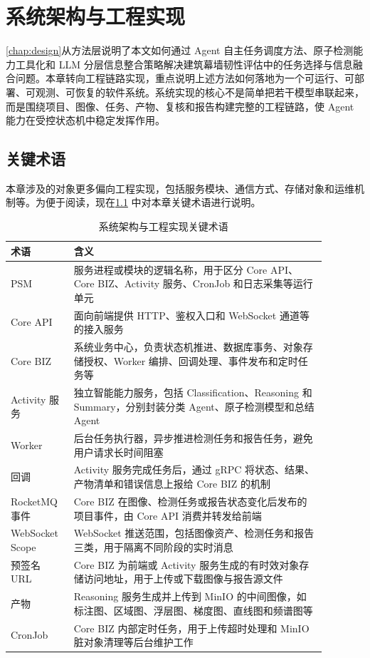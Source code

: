 \chapter{系统架构与工程实现}
\label{chap:implementation}

\cref{chap:design}从方法层说明了本文如何通过 Agent 自主任务调度方法、原子检测能力工具化和 LLM 分层信息整合策略解决建筑幕墙韧性评估中的任务选择与信息融合问题。本章转向工程链路实现，重点说明上述方法如何落地为一个可运行、可部署、可观测、可恢复的软件系统。系统实现的核心不是简单把若干模型串联起来，而是围绕项目、图像、任务、产物、复核和报告构建完整的工程链路，使 Agent 能力在受控状态机中稳定发挥作用。

\section{关键术语}
\label{sec:implementation-key-terms}

本章涉及的对象更多偏向工程实现，包括服务模块、通信方式、存储对象和运维机制等。为便于阅读，现在\cref{tab:implementation-key-terms} 中对本章关键术语进行说明。

\begin{table}[!htb]
  \caption{系统架构与工程实现关键术语}\label{tab:implementation-key-terms}
  \centering
  \begin{tabular}{@{}p{0.16\linewidth}p{0.72\linewidth}@{}} \toprule
    \textbf{术语} & \textbf{含义} \\ \midrule
    PSM & 服务进程或模块的逻辑名称，用于区分 Core API、Core BIZ、Activity 服务、CronJob 和日志采集等运行单元 \\
    Core API & 面向前端提供 HTTP、鉴权入口和 WebSocket 通道等的接入服务 \\
    Core BIZ & 系统业务中心，负责状态机推进、数据库事务、对象存储授权、Worker 编排、回调处理、事件发布和定时任务等 \\
    Activity 服务 & 独立智能能力服务，包括 Classification、Reasoning 和 Summary，分别封装分类 Agent、原子检测模型和总结 Agent \\
    Worker & 后台任务执行器，异步推进检测任务和报告任务，避免用户请求长时间阻塞 \\
    回调 & Activity 服务完成任务后，通过 gRPC 将状态、结果、产物清单和错误信息上报给 Core BIZ 的机制 \\
    RocketMQ 事件 & Core BIZ 在图像、检测任务或报告状态变化后发布的项目事件，由 Core API 消费并转发给前端 \\
    WebSocket Scope & WebSocket 推送范围，包括图像资产、检测任务和报告三类，用于隔离不同阶段的实时消息 \\
    预签名 URL & Core BIZ 为前端或 Activity 服务生成的有时效对象存储访问地址，用于上传或下载图像与报告源文件 \\
    产物 & Reasoning 服务生成并上传到 MinIO 的中间图像，如标注图、区域图、浮层图、梯度图、直线图和频谱图等 \\
    CronJob & Core BIZ 内部定时任务，用于上传超时处理和 MinIO 脏对象清理等后台维护工作 \\ \bottomrule
  \end{tabular}
\end{table}

